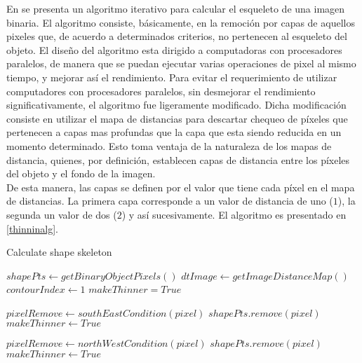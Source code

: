 En \cite{thinning} se presenta un algoritmo iterativo para calcular el esqueleto de
una imagen binaria. El algoritmo consiste, b\'asicamente, en la remoci\'on por capas
de aquellos pixeles que, de acuerdo a determinados criterios, no pertenecen al esqueleto
del objeto. El dise\~no del algoritmo esta dirigido a computadoras con procesadores 
paralelos, de manera que se puedan ejecutar varias operaciones de pixel al mismo tiempo,
y mejorar as\'i el rendimiento. Para evitar el requerimiento de utilizar computadores
con procesadores paralelos, sin desmejorar el rendimiento significativamente,
el algoritmo fue ligeramente modificado. Dicha modificaci\'on consiste en utilizar
el mapa de distancias para descartar chequeo de p\'ixeles que pertenecen a capas
mas profundas que la capa que esta siendo reducida en un momento determinado.
Esto toma ventaja de la naturaleza de los mapas de distancia, quienes, por definici\'on,
establecen capas de distancia entre los p\'ixeles del objeto y el fondo de la imagen.\\
De esta manera, las capas se definen por el valor que tiene cada p\'ixel en el mapa 
de distancias. La primera capa corresponde a un valor de distancia de uno ($1$), la segunda
un valor de dos ($2$) y as\'i sucesivamente. El algoritmo es presentado en \ref{thinninalg}.

\begin{algorithm}                     
\caption{Calculate shape skeleton}         
\label{thinninalg}                    
\begin{algorithmic}                   
\STATE $shapePts \leftarrow getBinaryObjectPixels()$
\STATE $dtImage \leftarrow getImageDistanceMap()$
\STATE $contourIndex \leftarrow 1$
\STATE $makeThinner = True$


\STATE {}
\STATE {}
\ELSE
\STATE $pixelRemove \leftarrow southEastCondition(pixel)$
\STATE $shapePts.remove(pixel)$
\STATE $makeThinner \leftarrow True$
\ENDIF

\ENDIF
\ENDFOR

\STATE {}
\STATE {}
\ELSE
\STATE $pixelRemove \leftarrow northWestCondition(pixel)$
\STATE $shapePts.remove(pixel)$
\STATE $makeThinner \leftarrow True$
\ENDIF
\ENDIF
\ENDFOR
\ENDWHILE
\STATE 
{}

\end{algorithmic}
\end{algorithm}

